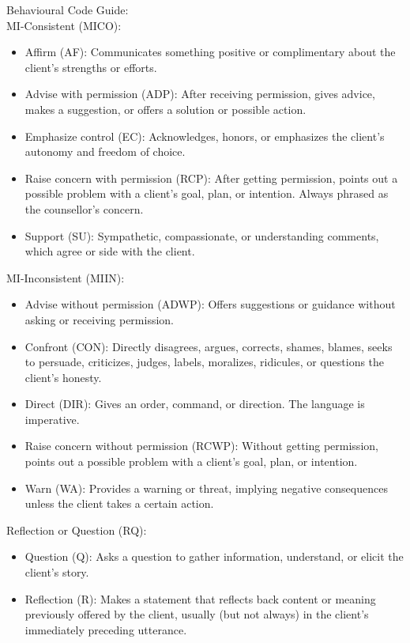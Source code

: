 \begin{tcolorbox}
	Behavioural Code Guide:\\

	MI-Consistent (MICO):
	\begin{itemize}[itemsep=0pt, parsep=0pt]
		\item Affirm (AF): Communicates something positive or complimentary about the client's strengths or efforts.
		\item Advise with permission (ADP): After receiving permission, gives advice, makes a suggestion, or offers a solution or possible action.
		\item Emphasize control (EC): Acknowledges, honors, or emphasizes the client's autonomy and freedom of choice.
		\item Raise concern with permission (RCP): After getting permission, points out a possible problem with a client's goal, plan, or intention. Always phrased as the counsellor's concern.
		\item Support (SU): Sympathetic, compassionate, or understanding comments, which agree or side with the client.
	\end{itemize}

	MI-Inconsistent (MIIN):
	\begin{itemize}[itemsep=0pt, parsep=0pt]
		\item Advise without permission (ADWP): Offers suggestions or guidance without asking or receiving permission.
		\item Confront (CON): Directly disagrees, argues, corrects, shames, blames, seeks to persuade, criticizes, judges, labels, moralizes, ridicules, or questions the client's honesty.
		\item Direct (DIR): Gives an order, command, or direction. The language is imperative.
		\item Raise concern without permission (RCWP): Without getting permission, points out a possible problem with a client's goal, plan, or intention.
		\item Warn (WA): Provides a warning or threat, implying negative consequences unless the client takes a certain action.
	\end{itemize}

	Reflection or Question (RQ):
	\begin{itemize}[itemsep=0pt, parsep=0pt]
		\item Question (Q): Asks a question to gather information, understand, or elicit the client's story.
		\item Reflection (R): Makes a statement that reflects back content or meaning previously offered by the client, usually (but not always) in the client's immediately preceding utterance.
	\end{itemize}


\end{tcolorbox}
